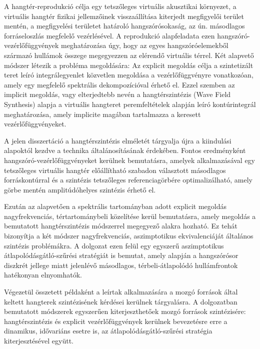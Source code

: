 A hangtér-reprodukció célja egy tetszőleges virtuális akusztikai környezet, a virtuális hangtér fizikai jellemzőinek visszaállítása kiterjedt megfigyelői terület mentén, a megfigyelési területet határoló hangszórósokaság, az ún. másodlagos forráseloszlás megfelelő vezérlésével. 
A reprodukció alapfeladata ezen hangszóró-vezérlőfüggvények meghatározása úgy, hogy az egyes hangszóróelemekből származó hullámok összege megegyezzen az elérendő virtuális térrel.
Két alapvető módszer létezik a probléma megoldására:
Az explicit megoldás célja a szintetizált teret leíró integrálegyenlet közvetlen megoldása a vezérlőfüggvényre vonatkozóan, amely egy megfelelő spektrális dekompozícióval érhető el.
Ezzel szemben az implicit megoldás, vagy elterjedtebb nevén a hangtérszintézis (Wave Field Synthesis) alapja a virtuális hangteret peremfeltételek alapján leíró kontúrintegrál meghatározása, amely implicite magában tartalmazza a keresett vezérlőfüggvényeket.

A jelen disszertáció a hangtérszintézis elméletét tárgyalja újra a kiindulási alapoktól kezdve a technika általánosításának érdekében.
Fontos eredményként hangszóró-vezérlőfüggvényeket kerülnek bemutatásra, amelyek alkalmazásával egy tetszőleges virtuális hangtér előállítható szabadon választott másodlagos forráskontúrral és a szintézis tetszőleges referenciagörbére optimalizálható, amely görbe mentén amp\-li\-tú\-dó\-he\-lyes szintézis érhető el.

Ezután az alapvetően a spektrális tartományban adott explicit megoldás nagyfrekvenciás, tértartománybeli közelítése kerül bemutatásra, amely megoldás a bemutatott hangtérszintézis módszerrel megegyező alakra hozható. 
Ez tehát bizonyítja a két módszer nagyfrekvenciás, aszimptotikus ekvivalenciáját általános szintézis problémákra.
A dolgozat ezen felül egy egyszerű aszimptotikus átlapolódásgátló-szűrési stratégiát is bemutat, amely alapján a hangszórósor diszkrét jellege miatt jelenlévő másodlagos, térbeli-átlapolódó hullámfrontok hatékonyan elnyomhatók.

Végezetül összetett példaként a leírtak alkalmazására a mozgó források által keltett hangterek szintézisének kérdései kerülnek tárgyalásra.
A dolgozatban bemutatott módszerek egyszerűen kiterjeszthetőek mozgó források szintézisére:
hangtérszintézis és explicit vezérlőfüggvények kerülnek bevezetésre erre a dinamikus, idővariáns esetre is, az átlapolódásgátló-szűrési stratégia kiterjesztésével együtt.
